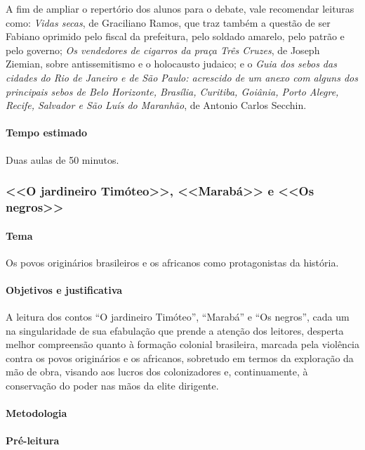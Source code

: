 \documentclass[11pt]{extarticle}
\begin{document}
A fim de ampliar o repertório dos alunos para o debate, vale recomendar
leituras como: \emph{Vidas secas}, de Graciliano Ramos, que traz também
a questão de ser Fabiano oprimido pelo fiscal da prefeitura, pelo
soldado amarelo, pelo patrão e pelo governo; \emph{Os vendedores de
cigarros da praça Três Cruzes}, de Joseph Ziemian, sobre antissemitismo
e o holocausto judaico; e o \emph{Guia dos sebos das cidades do Rio de
Janeiro e de São Paulo: acrescido de um anexo com alguns dos principais
sebos de Belo Horizonte, Brasília, Curitiba, Goiânia, Porto Alegre,
Recife, Salvador e São Luís do Maranhão}, de Antonio Carlos Secchin.

\paragraph{Tempo estimado} Duas aulas de 50 minutos.



\subsubsection{<<O jardineiro Timóteo>>, <<Marabá>> e <<Os negros>>}

\paragraph{Tema} Os povos originários brasileiros e os africanos como protagonistas da história.

\paragraph{Objetivos e justificativa}
A leitura dos contos ``O jardineiro Timóteo'', ``Marabá'' e ``Os
negros'', cada um na singularidade de sua efabulação que prende a
atenção dos leitores, desperta melhor compreensão quanto à formação
colonial brasileira, marcada pela violência contra os povos originários
e os africanos, sobretudo em termos da exploração da mão de obra,
visando aos lucros dos colonizadores e, continuamente, à conservação do
poder nas mãos da elite dirigente.

\paragraph{Metodologia}

\asterisc\paragraph{Pré-leitura}
\end{document}
